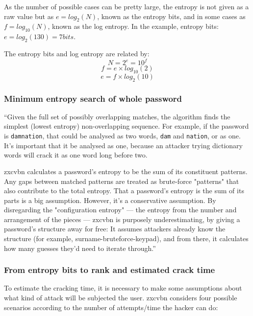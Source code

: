 As the number of possible cases can be pretty large, the entropy is not given as a raw value but as $e = log_{2}(N)$, known as the entropy bits, and in some cases as $f = log_{10}(N)$, known as the log entropy. In the example, entropy bits: $e = log_{2}(130) = 7 bits$.

The entropy bits and log entropy are related by:
\[N = 2^{e} = 10^{f}\]
\[f = e \times log_{10}(2)\]
\[e = f \times log_{2}(10)\]


\subsubsection*{Minimum entropy search of whole password}

``Given the full set of possibly overlapping matches, the algorithm finds the simplest (lowest entropy) non-overlapping sequence. For example, if the password is \texttt{damnation}, that could be analysed as two words, \texttt{dam} and \texttt{nation}, or as one. It’s important that it be analysed as one, because an attacker trying dictionary words will crack it as one word long before two.

zxcvbn calculates a password’s entropy to be the sum of its constituent patterns. Any gaps between matched patterns are treated as brute-force "patterns" that also contribute to the total entropy. That a password’s entropy is the sum of its parts is a big assumption. However, it’s a conservative assumption. By disregarding the "configuration entropy" — the entropy from the number and arrangement of the pieces — zxcvbn is purposely underestimating, by giving a password’s structure away for free: It assumes attackers already know the structure (for example, surname-bruteforce-keypad), and from there, it calculates how many guesses they’d need to iterate through.''\cite{zxdropbox}

\subsubsection*{From entropy bits to rank and estimated crack time} \label{sec:zxLevels}

To estimate the cracking time, it is necessary to make some assumptions about what kind of attack will be subjected the user. zxcvbn considers four possible scenarios according to the number of attempts/time the hacker can do:

